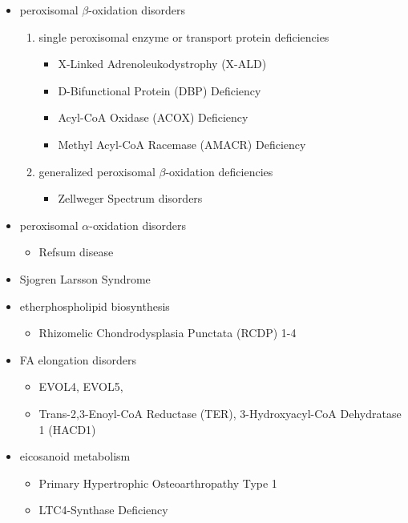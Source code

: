 \documentclass[fontsize=12pt]{scrartcl}
\begin{document}
\begin{enumerate}
\begin{enumerate}
\begin{enumerate}
\begin{enumerate}
\begin{table}[htbp]
\begin{enumerate}
\begin{enumerate}
\begin{enumerate}
\begin{enumerate}
\begin{enumerate}
\begin{enumerate}
\begin{enumerate}
\begin{itemize}
\item peroxisomal \(\beta\)-oxidation disorders
\begin{enumerate}
\item single peroxisomal enzyme or transport protein deficiencies
\begin{itemize}
\item X-Linked Adrenoleukodystrophy (X-ALD)
\item D-Bifunctional Protein (DBP) Deficiency
\item Acyl-CoA Oxidase (ACOX) Deficiency
\item Methyl Acyl-CoA Racemase (AMACR) Deficiency
\end{itemize}
\item generalized peroxisomal \(\beta\)-oxidation deficiencies
\begin{itemize}
\item Zellweger Spectrum disorders
\end{itemize}
\end{enumerate}
\item peroxisomal \(\alpha\)-oxidation disorders
\begin{itemize}
\item Refsum disease
\end{itemize}
\item Sjogren Larsson Syndrome
\item etherphospholipid biosynthesis
\begin{itemize}
\item Rhizomelic Chondrodysplasia Punctata (RCDP) 1-4
\end{itemize}
\item FA elongation disorders
\begin{itemize}
\item EVOL4, EVOL5,
\item Trans-2,3-Enoyl-CoA Reductase (TER), 3-Hydroxyacyl-CoA Dehydratase 1 (HACD1)
\end{itemize}
\item eicosanoid metabolism
\begin{itemize}
\item Primary Hypertrophic Osteoarthropathy Type 1
\item LTC4-Synthase Deficiency
\end{itemize}
\end{itemize}



\end{enumerate}
\end{enumerate}
\end{enumerate}
\end{enumerate}
\end{enumerate}
\end{enumerate}
\end{enumerate}
\end{table}
\end{enumerate}
\end{enumerate}
\end{enumerate}
\end{enumerate}
\end{document}
